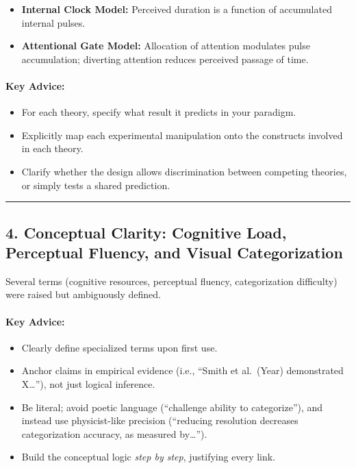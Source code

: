 \documentclass[
]{article}
\providecommand{\tightlist}{%
  \setlength{\itemsep}{0pt}\setlength{\parskip}{0pt}}
\begin{document}
\begin{itemize}
\tightlist
\item
  \textbf{Internal Clock Model:} Perceived duration is a function of
  accumulated internal pulses.
\item
  \textbf{Attentional Gate Model:} Allocation of attention modulates
  pulse accumulation; diverting attention reduces perceived passage of
  time.
\end{itemize}

\paragraph{\texorpdfstring{\textbf{Key
Advice:}}{Key Advice:}}\label{key-advice-2}

\begin{itemize}
\tightlist
\item
  For each theory, specify what result it predicts in your paradigm.
\item
  Explicitly map each experimental manipulation onto the constructs
  involved in each theory.
\item
  Clarify whether the design allows discrimination between competing
  theories, or simply tests a shared prediction.
\end{itemize}

\begin{center}\rule{0.5\linewidth}{0.5pt}\end{center}

\subsection{4. Conceptual Clarity: Cognitive Load, Perceptual Fluency,
and Visual
Categorization}\label{conceptual-clarity-cognitive-load-perceptual-fluency-and-visual-categorization}

Several terms (cognitive resources, perceptual fluency, categorization
difficulty) were raised but ambiguously defined.

\paragraph{\texorpdfstring{\textbf{Key
Advice:}}{Key Advice:}}\label{key-advice-3}

\begin{itemize}
\tightlist
\item
  Clearly define specialized terms upon first use.
\item
  Anchor claims in empirical evidence (i.e., ``Smith et al.~(Year)
  demonstrated X\ldots''), not just logical inference.
\item
  Be literal; avoid poetic language (``challenge ability to
  categorize''), and instead use physicist-like precision (``reducing
  resolution decreases categorization accuracy, as measured
  by\ldots{}'').
\item
  Build the conceptual logic \emph{step by step}, justifying every link.
\end{itemize}
\end{document}
